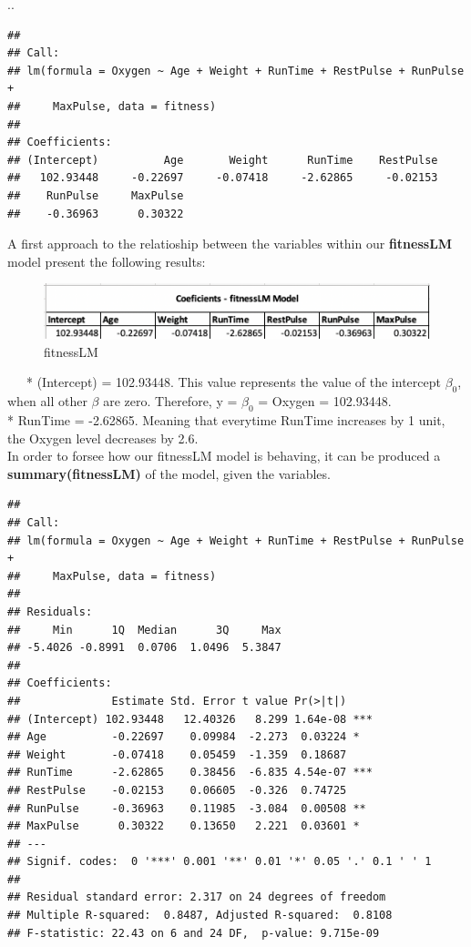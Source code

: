 \documentclass[]{article}
\begin{document}
..

\begin{verbatim}
## 
## Call:
## lm(formula = Oxygen ~ Age + Weight + RunTime + RestPulse + RunPulse + 
##     MaxPulse, data = fitness)
## 
## Coefficients:
## (Intercept)          Age       Weight      RunTime    RestPulse  
##   102.93448     -0.22697     -0.07418     -2.62865     -0.02153  
##    RunPulse     MaxPulse  
##    -0.36963      0.30322
\end{verbatim}

\textbar{} A first approach to the relatioship between the variables
within our \textbf{fitnessLM} model present the following results:

\begin{figure}
\centering
\includegraphics{images/1_fitnessLM_sum.png}
\caption{fitnessLM}
\end{figure}

~~~* (Intercept) = 102.93448. This value represents the value of the
intercept \(\beta_0\), when all other \(\beta\) are zero. Therefore, y =
\(\beta_0\) = Oxygen = 102.93448.\\
\hspace*{0.333em}\hspace*{0.333em}\hspace*{0.333em}* RunTime = -2.62865.
Meaning that everytime RunTime increases by 1 unit, the Oxygen level
decreases by 2.6.\\
\hspace*{0.333em}\hspace*{0.333em}\hspace*{0.333em}In order to forsee
how our fitnessLM model is behaving, it can be produced a
\textbf{summary(fitnessLM)} of the model, given the variables.

\begin{verbatim}
## 
## Call:
## lm(formula = Oxygen ~ Age + Weight + RunTime + RestPulse + RunPulse + 
##     MaxPulse, data = fitness)
## 
## Residuals:
##     Min      1Q  Median      3Q     Max 
## -5.4026 -0.8991  0.0706  1.0496  5.3847 
## 
## Coefficients:
##              Estimate Std. Error t value Pr(>|t|)    
## (Intercept) 102.93448   12.40326   8.299 1.64e-08 ***
## Age          -0.22697    0.09984  -2.273  0.03224 *  
## Weight       -0.07418    0.05459  -1.359  0.18687    
## RunTime      -2.62865    0.38456  -6.835 4.54e-07 ***
## RestPulse    -0.02153    0.06605  -0.326  0.74725    
## RunPulse     -0.36963    0.11985  -3.084  0.00508 ** 
## MaxPulse      0.30322    0.13650   2.221  0.03601 *  
## ---
## Signif. codes:  0 '***' 0.001 '**' 0.01 '*' 0.05 '.' 0.1 ' ' 1
## 
## Residual standard error: 2.317 on 24 degrees of freedom
## Multiple R-squared:  0.8487, Adjusted R-squared:  0.8108 
## F-statistic: 22.43 on 6 and 24 DF,  p-value: 9.715e-09
\end{verbatim}
\end{document}
